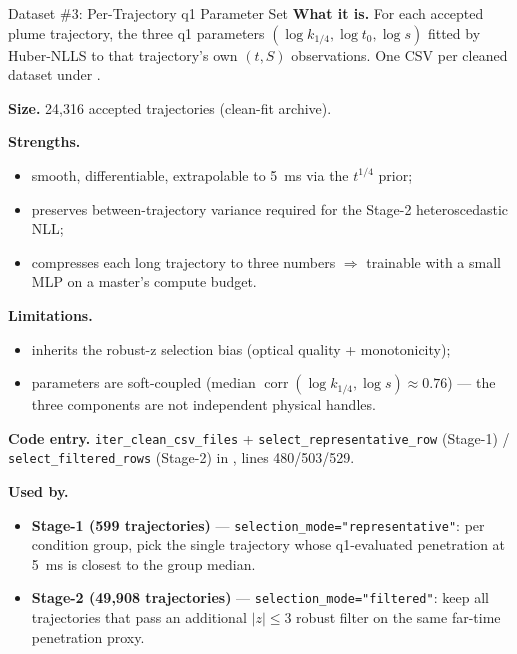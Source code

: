 \documentclass[UTF8,aspectratio=169]{ctexbeamer}
\newcommand{\warn}[1]{\textcolor{red!65!black}{#1}}
\begin{document}
\begin{frame}{Dataset \#3: Per-Trajectory q1 Parameter Set}
\small
\textbf{What it is.} For each accepted plume trajectory, the three q1 parameters \((\log k_{1/4}, \log t_0, \log s)\) fitted by Huber-NLLS to that trajectory's own \((t, S)\) observations. One CSV per cleaned dataset under .

\vspace{0.4em}
\textbf{Size.} 24{,}316 accepted trajectories (clean-fit archive).

\vspace{0.4em}
\textbf{Strengths.}
\begin{itemize}\setlength\itemsep{1.5pt}
  \item smooth, differentiable, extrapolable to \SI{5}{ms} via the \(t^{1/4}\) prior;
  \item preserves between-trajectory variance required for the Stage-2 heteroscedastic NLL;
  \item compresses each long trajectory to three numbers \(\Rightarrow\) trainable with a small MLP on a master's compute budget.
\end{itemize}

\textbf{Limitations.}
\begin{itemize}\setlength\itemsep{1.5pt}
  \item \warn{inherits the robust-z selection bias} (optical quality + monotonicity);
  \item parameters are soft-coupled (median \(\operatorname{corr}(\log k_{1/4}, \log s) \approx 0.76\)) --- the three components are not independent physical handles.
\end{itemize}

\vspace{0.4em}
\textbf{Code entry.} \texttt{iter\_clean\_csv\_files} + \texttt{select\_representative\_row} (Stage-1) / \texttt{select\_filtered\_rows} (Stage-2) in , lines 480/503/529.

\textbf{Used by.}
\begin{itemize}\setlength\itemsep{1pt}
  \item \textbf{Stage-1 (599 trajectories)} --- \texttt{selection\_mode="representative"}: per condition group, pick the single trajectory whose q1-evaluated penetration at \SI{5}{ms} is closest to the group median.
  \item \textbf{Stage-2 (49{,}908 trajectories)} --- \texttt{selection\_mode="filtered"}: keep all trajectories that pass an additional \(\lvert z\rvert\le 3\) robust filter on the same far-time penetration proxy.
\end{itemize}
\end{frame}
\end{document}
